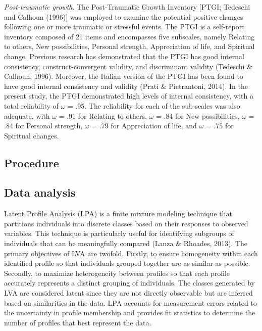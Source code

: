 \documentclass[
  man]{apa7}
\begin{document}
\emph{Post-traumatic growth}. The Post-Traumatic Growth Inventory {[}PTGI; Tedeschi and Calhoun (1996){]} was employed to examine the potential positive changes following one or more traumatic or stressful events. The PTGI is a self-report inventory composed of 21 items and encompasses five subscales, namely Relating to others, New possibilities, Personal strength, Appreciation of life, and Spiritual change. Previous research has demonstrated that the PTGI has good internal consistency, construct-convergent validity, and discriminant validity (Tedeschi \& Calhoun, 1996). Moreover, the Italian version of the PTGI has been found to have good internal consistency and validity (Prati \& Pietrantoni, 2014). In the present study, the PTGI demonstrated high levels of internal consistency, with a total reliability of \(\omega\) = .95. The reliability for each of the sub-scales was also adequate, with \(\omega\) = .91 for Relating to others, \(\omega\) = .84 for New possibilities, \(\omega\) = .84 for Personal strength, \(\omega\) = .79 for Appreciation of life, and \(\omega\) = .75 for Spiritual changes.

\hypertarget{procedure}{%
\subsection{Procedure}\label{procedure}}

\hypertarget{data-analysis}{%
\subsection{Data analysis}\label{data-analysis}}

Latent Profile Analysis (LPA) is a finite mixture modeling technique that partitions individuals into discrete classes based on their responses to observed variables. This technique is particularly useful for identifying subgroups of individuals that can be meaningfully compared (Lanza \& Rhoades, 2013). The primary objectives of LVA are twofold. Firstly, to ensure homogeneity within each identified profile so that individuals grouped together are as similar as possible. Secondly, to maximize heterogeneity between profiles so that each profile accurately represents a distinct grouping of individuals. The classes generated by LVA are considered latent since they are not directly observable but are inferred based on similarities in the data. LPA accounts for measurement errors related to the uncertainty in profile membership and provides fit statistics to determine the number of profiles that best represent the data.
\end{document}
